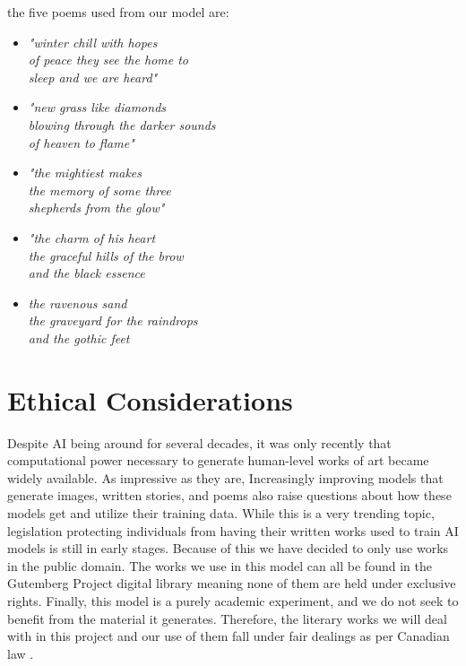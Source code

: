 \documentclass{article} %
\begin{document}
the five poems used from our model are:

\begin{itemize}


  \item \textit{"winter chill with hopes \\
  of peace they see the home to \\
  sleep and we are heard"}

  \item \textit{"new grass like diamonds \\
  blowing through the darker sounds \\
  of heaven to flame"}

  \item \textit{"the mightiest makes \\
  the memory of some three \\
  shepherds from the glow"}

  \item \textit{"the charm of his heart \\
  the graceful hills of the brow \\
  and the black essence}

  \item \textit{the ravenous sand \\
  the graveyard for the raindrops \\
  and the gothic feet}

\end{itemize}

\section{Ethical Considerations}

Despite AI being around for several decades, it was only recently that computational power necessary to generate human-level works of art became widely available.
As impressive as they are, Increasingly improving models that generate images, written stories, and poems also raise questions about how these models get and utilize their training data.
While this is a very trending topic, legislation protecting individuals from having their written works used to train AI models is still in early stages.
Because of this we have decided to only use works in the public domain.
The works we use in this model can all be found in the Gutemberg Project digital library meaning none of them are held under exclusive rights.
Finally, this model is a purely academic experiment, and we do not seek to benefit from the material it generates.
Therefore, the literary works we will deal with in this project and our use of them fall under fair dealings as per Canadian law \citep{LegislativeServicesBranch_2024} .
\end{document}
